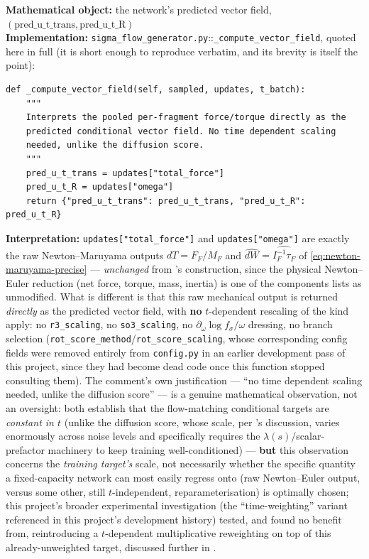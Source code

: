 \documentclass[11pt,a4paper]{report}
\theoremstyle{definition}
\theoremstyle{remark}
\newcommand{\file}[1]{\texttt{#1}}
\newcommand{\pyfunc}[1]{\texttt{#1}}
\begin{document}
\begin{codebox}
\textbf{Mathematical object:} the network's predicted vector field,
$(\mathrm{pred\_u\_t\_trans},\mathrm{pred\_u\_t\_R})$ \\
\textbf{Implementation:} \file{sigma\_flow\_generator.py}::\pyfunc{\_compute\_vector\_field},
quoted here in full (it is short enough to reproduce verbatim, and its
brevity is itself the point):
\begin{verbatim}
def _compute_vector_field(self, sampled, updates, t_batch):
    """
    Interprets the pooled per-fragment force/torque directly as the
    predicted conditional vector field. No time dependent scaling
    needed, unlike the diffusion score.
    """
    pred_u_t_trans = updates["total_force"]
    pred_u_t_R = updates["omega"]
    return {"pred_u_t_trans": pred_u_t_trans, "pred_u_t_R": pred_u_t_R}
\end{verbatim}
\textbf{Interpretation:} \texttt{updates["total\_force"]} and
\texttt{updates["omega"]} are exactly the raw Newton--Maruyama outputs
$dT=F_F/M_F$ and $\widehat{dW}=\widehat{I_F^{-1}\tau_F}$ of
\eqref{eq:newton-maruyama-precise} --- \emph{unchanged} from
's construction, since the physical
Newton--Euler reduction (net force, torque, mass, inertia) is one of the
components  lists as unmodified.
What is different is that this raw mechanical output is returned
\emph{directly} as the predicted vector field, with \textbf{no}
$t$-dependent rescaling of the kind
apply: no \texttt{r3\_scaling}, no \texttt{so3\_scaling}, no
$\partial_\omega\log f_\sigma/\omega$ dressing, no branch selection
(\texttt{rot\_score\_method}/\texttt{rot\_score\_scaling}, whose
corresponding config fields were removed entirely from
\file{config.py} in an earlier development pass of this project, since
they had become dead code once this function stopped consulting them).
The comment's own justification --- ``no time dependent scaling needed,
unlike the diffusion score'' --- is a genuine mathematical observation, not
an oversight: 
both establish that the flow-matching conditional targets are
\emph{constant in $t$} (unlike the diffusion score, whose scale, per
's discussion, varies enormously across noise
levels and specifically requires the $\lambda(s)$/scalar-prefactor
machinery to keep training well-conditioned) --- \textbf{but} this
observation concerns the \emph{training target's} scale, not necessarily
whether the specific quantity a fixed-capacity network can most easily
regress onto (raw Newton--Euler output, versus some other, still
$t$-independent, reparameterisation) is optimally chosen; this project's
broader experimental investigation (the ``time-weighting'' variant referenced
in this project's development history) tested, and found no benefit from,
reintroducing a $t$-dependent multiplicative reweighting on top of this
already-unweighted target, discussed further in
.
\end{codebox}
\end{document}
